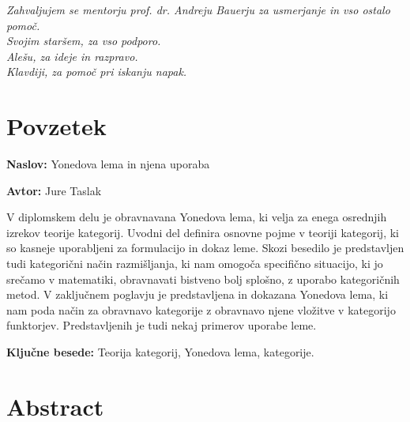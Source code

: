 \documentclass[12pt,a4paper]{book}
\newcommand{\ttitle}{Yonedova lema in njena uporaba}
\newcommand{\tauthor}{Jure Taslak}
\newcommand{\tkeywords}{Teorija kategorij, Yonedova lema, kategorije}
\newcommand{\clearemptydoublepage}{\newpage{\pagestyle{empty}\cleardoublepage}}
\theoremstyle{definition}
\theoremstyle{plain}
\theoremstyle{definition}
\theoremstyle{remark}
\begin{document}
\vspace{2cm}

\clearemptydoublepage

\thispagestyle{empty}\mbox{}\vfill\null\it%
\noindent
Zahvaljujem se mentorju prof. dr. Andreju Bauerju za usmerjanje in vso ostalo pomoč. \\
Svojim staršem, za vso podporo. \\
Alešu, za ideje in razpravo. \\
Klavdiji, za pomoč pri iskanju napak.
\rm\normalfont

\clearemptydoublepage

\pagestyle{empty}
\def\thepage{}%
\tableofcontents{}

\clearemptydoublepage


\chapter*{Povzetek}

\noindent\textbf{Naslov:} \ttitle
\bigskip

\noindent\textbf{Avtor:} \tauthor
\bigskip

\noindent
V diplomskem delu je obravnavana Yonedova lema, ki velja za enega osrednjih izrekov teorije kategorij. Uvodni del definira osnovne pojme v teoriji kategorij, ki so kasneje uporabljeni za formulacijo in dokaz leme. Skozi besedilo je predstavljen tudi kategorični način razmišljanja, ki nam omogoča specifično situacijo, ki jo srečamo v matematiki, obravnavati bistveno bolj splošno, z uporabo kategoričnih metod.
V zaključnem poglavju je predstavljena in dokazana Yonedova lema, ki nam poda način za obravnavo kategorije z obravnavo njene vložitve v kategorijo funktorjev. Predstavljenih je tudi nekaj primerov uporabe leme.
\bigskip

\noindent\textbf{Ključne besede:} \tkeywords.
\clearemptydoublepage

\chapter*{Abstract}
\end{document}
